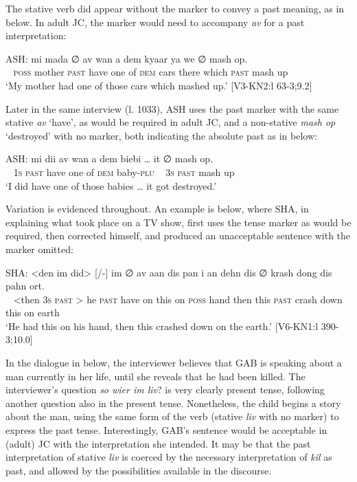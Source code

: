 \documentclass[output=paper,colorlinks,citecolor=brown]{langscibook}
\begin{document}
The stative verb did appear without the marker to convey a past meaning, as in  below. In adult JC, the marker would need to accompany \textit{av} for a past interpretation:

\ea \label{bkm:messamK:10}
\gll   ASH:   mi mada ∅  av wan a dem kyaar ya we ∅  mash op.\\
~ \textsc{poss} mother \textsc{past} have one of \textsc{dem} cars there which \textsc{past} mash up\\
\glt  \hphantom{ASH:}       ‘My mother had one of those cars which mashed up.’
[V3-KN2:l 63-3;9.2]
\z




Later in the same interview (l. 1033), ASH uses the past marker with the same stative \textit{av} ‘have’, as would be required in adult JC, and a non-stative \textit{mash op} ‘destroyed’ with no marker, both indicating the absolute past as in  below:

\ea \label{bkm:messamK:11}
\gll ASH:   mi dii av wan a dem biebi … it ∅ mash op.\\
~ 1\textsc{s} \textsc{past} have one of \textsc{dem} baby-\textsc{plu} ~ 3\textsc{s} \textsc{past} mash up\\
\glt `I did have one of those babies … it got destroyed.’
\z




Variation is evidenced throughout. An example is  below, where SHA, in explaining what took place on a TV show, first uses the tense marker as would be required, then corrected himself, and produced an unacceptable sentence with the marker omitted:


\ea \label {bkm:messamK:12}
\gll SHA:    <den im did> [/-] im ∅ av aan dis pan i an dehn dis ∅ krash dong dis pahn ort.\\
~ <then 3\textsc{s} \textsc{past} > he \textsc{past} have on this on \textsc{poss} hand then this \textsc{past} crash down this on earth\\
\glt  `He had this on his hand, then this crashed down on the earth.’
[V6-KN1:l 390-3;10.0]
\z


In the dialogue in  below, the interviewer believes that GAB is speaking about a man currently in her life, until she reveals that he had been killed. The interviewer’s question \textit{so wier im liv}? is very clearly present tense, following another question also in the present tense. Nonetheless, the child begins a story about the man, using the same form of the verb (stative \textit{liv} with no marker) to express the past tense. Interestingly, GAB’s sentence would be acceptable in (adult) JC with the interpretation she intended. It may be that the past interpretation of stative \textit{liv} is coerced by the necessary interpretation of \textit{kil} as past, and allowed by the possibilities available in the discourse.
\end{document}
